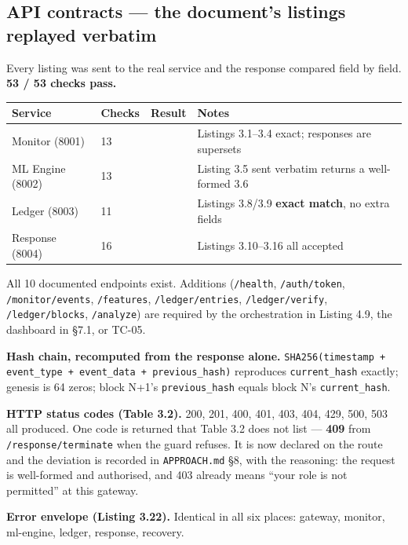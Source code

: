 \documentclass[11pt,a4paper]{article}
\newcommand{\ok}{\textcolor{okgreen}{\ding{51}}}
\begin{document}
\subsection{API contracts --- the document's listings replayed verbatim}

Every listing was sent to the real service and the response compared field by
field. \textbf{53 / 53 checks pass.}

\begin{center}
\begin{tabularx}{\linewidth}{@{}P{3.0cm}K{1.6cm}K{1.4cm}L@{}}
\toprule
\textbf{Service} & \textbf{Checks} & \textbf{Result} & \textbf{Notes} \\
\midrule
Monitor (8001)   & 13 & \ok & Listings 3.1--3.4 exact; responses are supersets \\
ML Engine (8002) & 13 & \ok & Listing 3.5 sent verbatim returns a well-formed 3.6 \\
Ledger (8003)    & 11 & \ok & Listings 3.8/3.9 \textbf{exact match}, no extra fields \\
Response (8004)  & 16 & \ok & Listings 3.10--3.16 all accepted \\
\bottomrule
\end{tabularx}
\end{center}

All 10 documented endpoints exist. Additions (\texttt{/health}, \texttt{/auth/token},
\texttt{/monitor/events}, \texttt{/features}, \texttt{/ledger/entries}, \texttt{/ledger/verify},
\texttt{/ledger/blocks}, \texttt{/analyze}) are required by the orchestration in Listing 4.9,
the dashboard in \S7.1, or TC-05.

\textbf{Hash chain, recomputed from the response alone.}
\texttt{SHA256(timestamp + event\_type + event\_data + previous\_hash)} reproduces
\texttt{current\_hash} exactly; genesis is 64 zeros; block N+1's \texttt{previous\_hash}
equals block N's \texttt{current\_hash}.

\textbf{HTTP status codes (Table 3.2).} 200, 201, 400, 401, 403, 404, 429, 500, 503
all produced. One code is returned that Table 3.2 does not list --- \textbf{409} from
\texttt{/response/terminate} when the guard refuses. It is now declared on the route and
the deviation is recorded in \texttt{APPROACH.md} \S8, with the reasoning: the request is
well-formed and authorised, and 403 already means ``your role is not permitted''
at this gateway.

\textbf{Error envelope (Listing 3.22).} Identical in all six places: gateway, monitor,
ml-engine, ledger, response, recovery.
\end{document}
